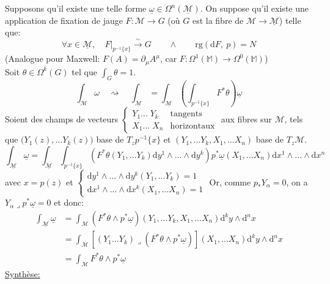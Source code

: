\documentclass[a4paper,11pt]{article}
\renewcommand{\d}{{\mathrm{d}}}
\begin{document}
Supposons qu'il existe une telle forme $\underline \omega \in \Omega^n(\underline{\mathcal{M}})$. On suppose qu'il existe une application de fixation de jauge $F:\mathcal{M}\to G$ (où $G$ est la fibre de $\mathcal{M}\to\underline{\mathcal{M}}$) telle que:
$$\forall x \in \underline{\mathcal M}, \quad F\Big|_{p^{-1}\{x\}} \overset\sim\to G \quad \quad \wedge \quad \quad \mathrm{rg}(\d F, \ p) = N$$
(Analogue pour Maxwell: $F(A)=\partial_\mu A^\mu$, car $F:\Omega^1(\mathbb M) \to \Omega^0(\mathbb M)$\quad)\\
Soit $\theta\in\Omega^k(G)$ tel que $\int_G\theta=1$.
$$\int_{\mathcal M} \omega  \quad \rightsquigarrow \quad \int_{\underline{\mathcal M}} = \int_{\underline{\mathcal M}} \left(\int_{p^{-1}\{x\}}F^*\theta\right)\underline \omega$$
Soient des champs de vecteurs $\left\{\begin{matrix}
Y_1  ...  \;Y_k & \mathrm{tangents}\\
X_1  ...  \;X_n & \mathrm{horizontaux}
\end{matrix}\right.$ aux fibres sur $\mathcal M$, tels que $\bigg(Y_1(z), ... Y_k(z)\bigg)$ base de $T_zp^{-1}\{x\}$ et $(Y_1, ... Y_k, X_1, ... X_n)$ base de $T_z\mathcal M$.
$$\int_{\underline{\mathcal M}} \underline\omega= 
\int_{\underline{\mathcal M}} \int_{p^{-1}\{x\}} \left(F^*\theta(Y_1, ... Y_k)\d y^1\wedge...\wedge\d y^k\right) p^*\underline\omega(X_1,...X_n)\d x^1\wedge...\wedge\d x^n$$
avec $x=p(z)$ et \!$\left\{\begin{matrix}
\d y^1\wedge...\wedge\d y^k (Y_1, ... Y_k) = 1\\
\d x^1\wedge...\wedge\d x^k (X_1, ... X_n) = 1
\end{matrix}\right.$ Or, comme $p_*Y_\alpha = 0$, on a $Y_\alpha\lrcorner p^*\underline\omega=0$ et donc:
\begin{align*}
\int_{\underline{\mathcal M}} \underline\omega &= 
\int_{\mathcal M} \left(F^*\theta\wedge p^*\underline\omega\right)(Y_1, ...Y_k, X_1,...X_n)\d^k y\wedge\d^n x\\
&= 
\int_{\mathcal M} \left[(Y_1...Y_k)\lrcorner(F^*\theta\wedge p^*\underline\omega)\right](X_1,...X_n)\d^k y\wedge\d^n x\\
&= 
\int_{\mathcal M} F^*\theta\wedge p^*\underline\omega
\end{align*}
\underline{Synthèse:}
\end{document}
